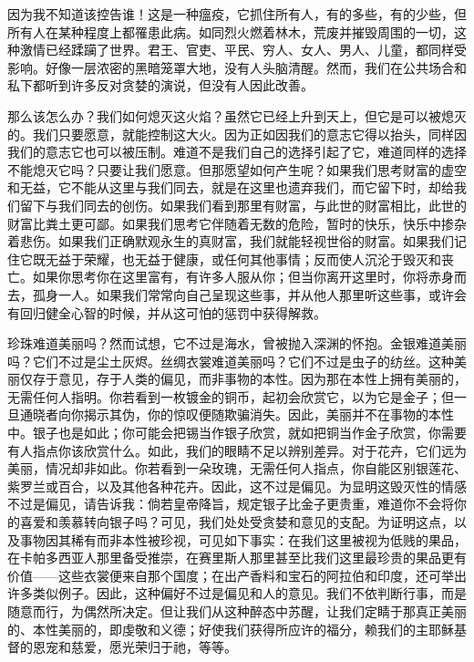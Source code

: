 因为我不知道该控告谁！这是一种瘟疫，它抓住所有人，有的多些，有的少些，但所有人在某种程度上都罹患此病。如同烈火燃着林木，荒废并摧毁周围的一切，这种激情已经蹂躏了世界。君王、官吏、平民、穷人、女人、男人、儿童，都同样受影响。好像一层浓密的黑暗笼罩大地，没有人头脑清醒。然而，我们在公共场合和私下都听到许多反对贪婪的演说，但没有人因此改善。\par

那么该怎么办？我们如何熄灭这火焰？虽然它已经上升到天上，但它是可以被熄灭的。我们只要愿意，就能控制这大火。因为正如因我们的意志它得以抬头，同样因我们的意志它也可以被压制。难道不是我们自己的选择引起了它，难道同样的选择不能熄灭它吗？只要让我们愿意。但那愿望如何产生呢？如果我们思考财富的虚空和无益，它不能从这里与我们同去，就是在这里也遗弃我们，而它留下时，却给我们留下与我们同去的创伤。如果我们看到那里有财富，与此世的财富相比，此世的财富比粪土更可鄙。如果我们思考它伴随着无数的危险，暂时的快乐，快乐中掺杂着悲伤。如果我们正确默观永生的真财富，我们就能轻视世俗的财富。如果我们记住它既无益于荣耀，也无益于健康，或任何其他事情；反而使人沉沦于毁灭和丧亡。如果你思考你在这里富有，有许多人服从你；但当你离开这里时，你将赤身而去，孤身一人。如果我们常常向自己呈现这些事，并从他人那里听这些事，或许会有回归健全心智的时候，并从这可怕的惩罚中获得解救。\par

珍珠难道美丽吗？然而试想，它不过是海水，曾被抛入深渊的怀抱。金银难道美丽吗？它们不过是尘土灰烬。丝绸衣裳难道美丽吗？它们不过是虫子的纺丝。这种美丽仅存于意见，存于人类的偏见，而非事物的本性。因为那在本性上拥有美丽的，无需任何人指明。你若看到一枚镀金的铜币，起初会欣赏它，以为它是金子；但一旦通晓者向你揭示其伪，你的惊叹便随欺骗消失。因此，美丽并不在事物的本性中。银子也是如此；你可能会把锡当作银子欣赏，就如把铜当作金子欣赏，你需要有人指点你该欣赏什么。如此，我们的眼睛不足以辨别差异。对于花卉，它们远为美丽，情况却非如此。你若看到一朵玫瑰，无需任何人指点，你自能区别银莲花、紫罗兰或百合，以及其他各种花卉。因此，这不过是偏见。为显明这毁灭性的情感不过是偏见，请告诉我：倘若皇帝降旨，规定银子比金子更贵重，难道你不会将你的喜爱和羡慕转向银子吗？可见，我们处处受贪婪和意见的支配。为证明这点，以及事物因其稀有而非本性被珍视，可见如下事实：在我们这里被视为低贱的果品，在卡帕多西亚人那里备受推崇，在赛里斯人那里甚至比我们这里最珍贵的果品更有价值——这些衣裳便来自那个国度；在出产香料和宝石的阿拉伯和印度，还可举出许多类似例子。因此，这种偏好不过是偏见和人的意见。我们不依判断行事，而是随意而行，为偶然所决定。但让我们从这种醉态中苏醒，让我们定睛于那真正美丽的、本性美丽的，即虔敬和义德；好使我们获得所应许的福分，赖我们的主耶稣基督的恩宠和慈爱，愿光荣归于祂，等等。\par

